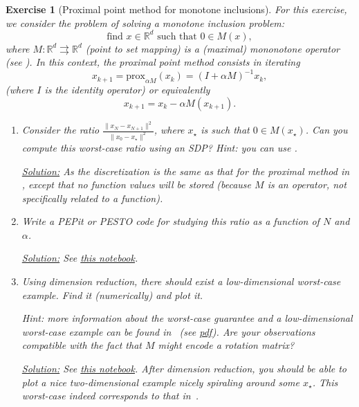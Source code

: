 \documentclass[11pt,a4paper]{article}
\newcommand{\pesto}{{PESTO }}
\newcommand{\pepit}{{PEPit }}
\newcommand{\correction}[1]{{{\color{blue}\underline{Solution:} #1}}}
\newcommand{\correction}[1]{}
\newtheorem{exercise}{Exercise}
\begin{document}
\begin{exercise}[Proximal point method for monotone inclusions]\label{ex:ppm2}
	For this exercise, we consider the problem of solving a monotone inclusion problem:
	\[ \text{find } x\in\mathbb{R}^d \text{ such that } 0\in M(x),\]
	where $M:\mathbb{R}^d\rightrightarrows {\mathbb{R}^d}$ (point to set mapping) is a (maximal) mononotone operator (see ). In this context, the proximal point method consists in iterating
	\[ x_{k+1}=\mathrm{prox}_{\alpha M}(x_k)=(I+\alpha M)^{-1} x_k,\]
(where $I$ is the identity operator) or equivalently 
	\[ x_{k+1}=x_k-\alpha M(x_{k+1}).\]
	\begin{enumerate}
	\item Consider the ratio $\frac{\|x_{N}-x_{N+1}\|^2}{\|x_0-x_\star\|^2}$, where $x_\star$ is such that $0\in M(x_\star)$. Can you compute this worst-case ratio using an SDP? Hint: you can use .
	
	\correction{As the discretization is the same as that for the proximal method in \Cref{ex:ppm}, except that no function values will be stored (because $M$ is an operator, not specifically related to a function).}
	
	\item Write a \pepit or \pesto code for studying this ratio as a function of $N$ and $\alpha$.
	
	\correction{See \href{https://github.com/PerformanceEstimation/Learning-Performance-Estimation/tree/main/Codes/Jupyter/Exercise06.ipynb}{this notebook}.}
	
	\item Using dimension reduction, there should exist a low-dimensional worst-case example. Find it (numerically) and plot it.
	
	Hint: more information about the worst-case guarantee and a low-dimensional worst-case example can be found in~\cite{gu2020tight} (see \href{https://arxiv.org/pdf/1904.05495.pdf}{pdf}). Are your observations compatible with the fact that $M$ might encode a rotation matrix?
	
	\correction{See \href{https://github.com/PerformanceEstimation/Learning-Performance-Estimation/tree/main/Codes/Jupyter/Exercise06.ipynb}{this notebook}. After dimension reduction, you should be able to plot a nice two-dimensional example nicely spiraling around some $x_\star$. This worst-case indeed corresponds to that in~\cite{gu2020tight}.}
		
	\end{enumerate}
	\end{exercise}
	
\end{document}
